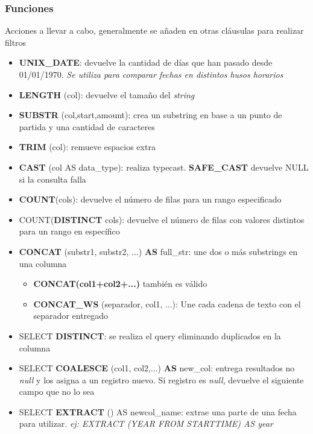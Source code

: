 \subsubsection{Funciones}
Acciones a llevar a cabo, generalmente se añaden en otras cláusulas para realizar filtros
\begin{itemize}
    \item {\textbf{UNIX\_DATE}: devuelve la cantidad de días que han pasado desde 01/01/1970. \textit{Se utiliza para comparar fechas en distintos husos horarios}}
    \item {\textbf{LENGTH} (col): devuelve el tamaño del \textit{string}}
    \item {\textbf{SUBSTR} (col,start,amount): crea un substring en base a un punto de partida y una cantidad de caracteres}
    \item {\textbf{TRIM} (col): remueve espacios extra}
    \item {\textbf{CAST} (col AS data\_type): realiza \gls{typecast}. \textbf{SAFE\_CAST} devuelve NULL si la consulta falla}
    \item {\textbf{COUNT}(cols): devuelve el número de filas para un rango especificado}
    \item {COUNT(\textbf{DISTINCT} cols): devuelve el número de filas con valores distintos para un rango en específico}
    \item {\textbf{CONCAT} (substr1, substr2, ...) \textbf{AS} full\_str: une dos o más substrings en una columna
    \begin{itemize}
        \item {\textbf{CONCAT(col1+col2+...)} también es válido}
        \item {\textbf{CONCAT\_WS} (separador, col1, ...): Une cada cadena de texto con el separador entregado}
    \end{itemize}}
    \item {SELECT \textbf{DISTINCT}: se realiza el query eliminando duplicados en la columna}
    \item {SELECT \textbf{COALESCE} (col1, col2,...) \textbf{AS} new\_col: entrega resultados no \textit{null} y los asigna a un registro nuevo. Si registro es \textit{null}, devuelve el siguiente campo que no lo sea}
    \item {SELECT \textbf{EXTRACT} () AS newcol\_name: extrae una parte de una fecha para utilizar. \textit{ej: EXTRACT (YEAR FROM STARTTIME) AS year} }
\end{itemize}


